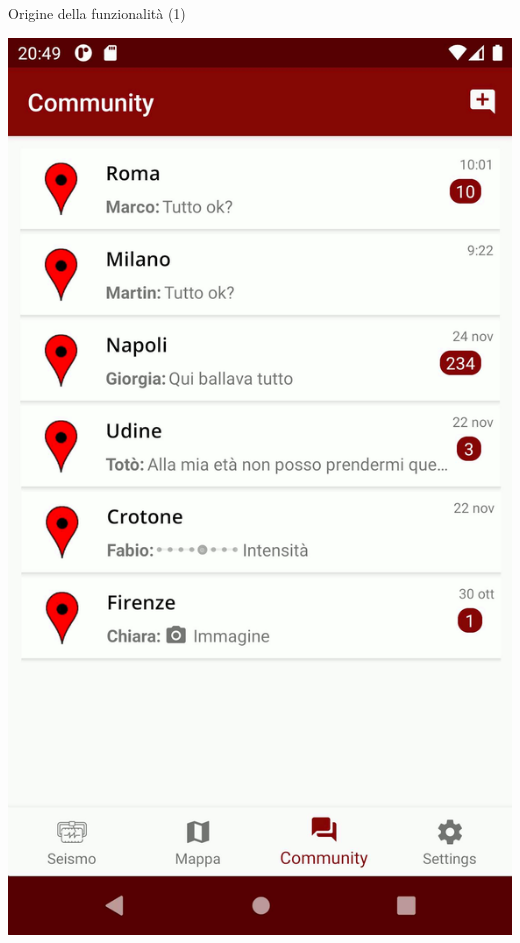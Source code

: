\documentclass[compress]{beamer}
\begin{document}
\begin{frame}[c]{Origine della funzionalità (1)}
\begin{center}
\includegraphics[scale=0.3]{assets/02/menu.png}
\hspace{2em}

\end{center}
\end{frame}
\end{document}
